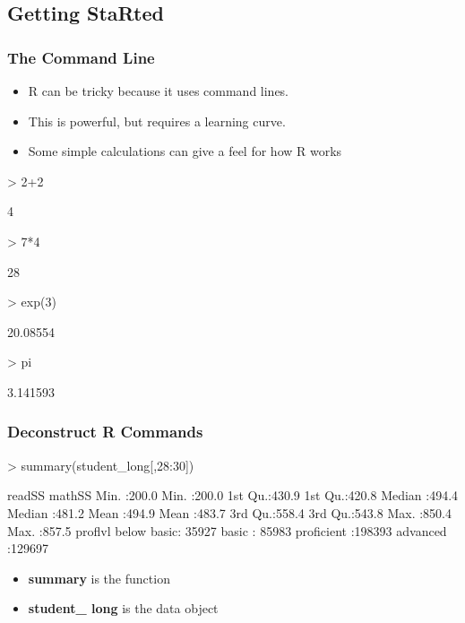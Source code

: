 \documentclass{beamer}
\begin{document}
\subsection{Getting StaRted}
\label{sec: start}

\begin{frame}[containsverbatim]
\frametitle{The Command Line}
\begin{itemize}
\item R can be tricky because it uses command lines.
\item This is powerful, but requires a learning curve.
\item Some simple calculations can give a feel for how R works
\end{itemize}
\begin{Schunk}
\begin{Sinput}
> 2+2
\end{Sinput}
\begin{Soutput}
[1] 4
\end{Soutput}
\begin{Sinput}
> 7*4
\end{Sinput}
\begin{Soutput}
[1] 28
\end{Soutput}
\begin{Sinput}
> exp(3)
\end{Sinput}
\begin{Soutput}
[1] 20.08554
\end{Soutput}
\begin{Sinput}
> pi
\end{Sinput}
\begin{Soutput}
[1] 3.141593
\end{Soutput}
\end{Schunk}
\end{frame}

\begin{frame}[containsverbatim]
\frametitle{Deconstruct R Commands}
\begin{Schunk}
\begin{Sinput}
> summary(student_long[,28:30])
\end{Sinput}
\begin{Soutput}
     readSS          mathSS     
 Min.   :200.0   Min.   :200.0  
 1st Qu.:430.9   1st Qu.:420.8  
 Median :494.4   Median :481.2  
 Mean   :494.9   Mean   :483.7  
 3rd Qu.:558.4   3rd Qu.:543.8  
 Max.   :850.4   Max.   :857.5  
        proflvl      
 below basic: 35927  
 basic      : 85983  
 proficient :198393  
 advanced   :129697  
\end{Soutput}
\end{Schunk}
\begin{itemize}
  \item \textbf{summary} is the function
  \item \textbf{student\_ long} is the data object
\end{itemize}
\end{frame}
\end{document}
